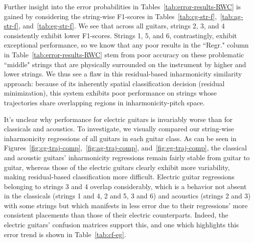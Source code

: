 \documentclass[12pt]{cmuthesis}
\begin{document}
Further insight into the error probabilities in Tables~\ref{tab:error-results-RWC} is gained by considering the string-wise F1-scores in Tables~\ref{tab:cg-str-f},~\ref{tab:ag-str-f}, and~\ref{tab:eg-str-f}. We see that across all guitars, strings 2, 3, and 4 consistently exhibit lower F1-scores. Strings 1, 5, and 6, contrastingly, exhibit exceptional performance, so we know that any poor results in the ``Regr." column in Table~\ref{tab:error-results-RWC} stem from poor accuracy on these problematic ``middle" strings that are physically surrounded on the instrument by higher and lower strings. We thus see a flaw in this residual-based inharmonicity similarity approach: because of its inherently spatial classification decision (residual minimization), this system exhibits poor performance on strings whose trajectories share overlapping regions in inharmonicity-pitch space.

It's unclear why performance for electric guitars is invariably worse than for classicals and acoustics. To investigate, we visually compared our string-wise inharmonicity regressions of all guitars in each guitar class. As can be seen in Figures~\ref{fig:cg-traj-comp},~\ref{fig:ag-traj-comp}, and~\ref{fig:eg-traj-comp}, the classical and acoustic guitars' inharmonicity regressions remain fairly stable from guitar to guitar, whereas those of the electric guitars clearly exhibit more variability, making residual-based classification more difficult. Electric guitar regressions belonging to strings 3 and 4 overlap considerably, which is a behavior not absent in the classicals (strings 1 and 4, 2 and 5, 3 and 6) and acoustics (strings 2 and 3) with some strings but which manifests in less error due to their regressions' more consistent placements than those of their electric counterparts. Indeed, the electric guitars' confusion matrices support this, and one which highlights this error trend is shown in Table~\ref{tab:cf-eg}. 
\end{document}
